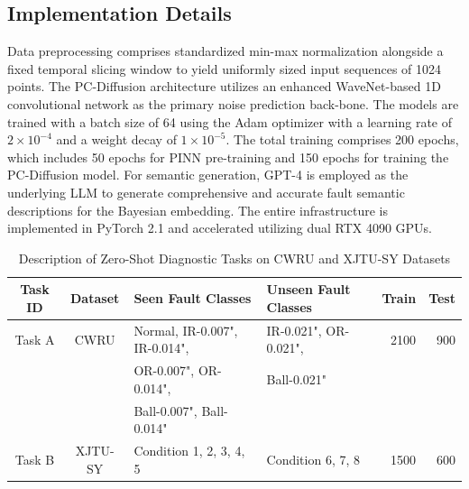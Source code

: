 \documentclass[journal]{IEEEtran}
\begin{document}
\subsection{Implementation Details}
Data preprocessing comprises standardized min-max normalization alongside a fixed temporal slicing window to yield uniformly sized input sequences of 1024 points. The PC-Diffusion architecture utilizes an enhanced WaveNet-based 1D convolutional network as the primary noise prediction back-bone. The models are trained with a batch size of 64 using the Adam optimizer with a learning rate of $2 \times 10^{-4}$ and a weight decay of $1 \times 10^{-5}$. The total training comprises 200 epochs, which includes 50 epochs for PINN pre-training and 150 epochs for training the PC-Diffusion model. For semantic generation, GPT-4 is employed as the underlying LLM to generate comprehensive and accurate fault semantic descriptions for the Bayesian embedding. The entire infrastructure is implemented in PyTorch 2.1 and accelerated utilizing dual RTX 4090 GPUs.%
\begin{table}[!t]
\centering
\caption{Description of Zero-Shot Diagnostic Tasks on CWRU and XJTU-SY Datasets}
\label{tab:datasets}
\begin{tabular}{ccllrr}
\toprule
\textbf{Task ID} & \textbf{Dataset} & \textbf{Seen Fault Classes} & \textbf{Unseen Fault Classes} & \textbf{Train} & \textbf{Test} \\
\midrule
Task A & CWRU & Normal, IR-0.007", IR-0.014", & IR-0.021", OR-0.021", & 2100 & 900 \\
       &      & OR-0.007", OR-0.014", & Ball-0.021" & & \\
       &      & Ball-0.007", Ball-0.014" & & & \\
\midrule
Task B & XJTU-SY & Condition 1, 2, 3, 4, 5 & Condition 6, 7, 8 & 1500 & 600 \\
\bottomrule
\end{tabular}
\end{table}
\end{document}
